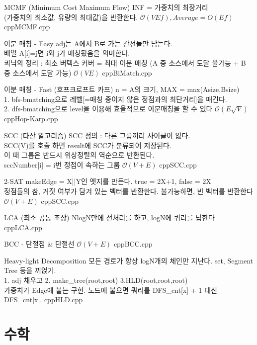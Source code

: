 \documentclass[landscape, 10pt, a4paper, oneside, twocolumn]{extarticle}
\begin{document}
\Algorithm
{MCMF (Minimum Cost Maximum Flow)}
{INF = 가중치의 최장거리\\
(가중치의 최소값, 유량의 최대값)을 반환한다.}
{$\mathcal{O}(VEf),{}Average = {O}(Ef)$}
{cpp}{MCMF.cpp}

\Algorithm
{이분 매칭 - Easy}
{adj는 A에서 B로 가는 간선들만 담는다.\\
배열 A[i]=j면 i와 j가 매칭됬음을 의미한다.\\
쾨닉의 정리 : 최소 버텍스 커버 = 최대 이분 매칭 (A 중 소스에서 도달 불가능 + B 중 소스에서 도달 가능)}
{$\mathcal{O}(VE)$}
{cpp}{BiMatch.cpp}

\Algorithm
{이분 매칭 - Fast (호프크로프트 카프)}
{n = A의 크기, MAX = max(Asize,Bsize)\\
1. bfs-bmatching으로 레벨[=매칭 중이지 않은 정점과의 최단거리]을 매긴다.\\
2. dfs-bmatching으로 level을 이용해 효율적으로 이분매칭을 할 수 있다
}
{$\mathcal{O}(E \sqrt{V})$}
{cpp}{Hop-Karp.cpp}

\Algorithm
{SCC (타잔 알고리즘)}
{SCC 정의 : 다른 그룹끼리 사이클이 없다.\\
SCC(V)를 호출 하면 result에 SCC가 분류되어 저장된다.\\
이 때 그룹은 반드시 위상정렬의 역순으로 반환된다.\\
sccNumber[i] = i번 정점이 속하는 그룹
}
{$\mathcal{O}(V+E)$}
{cpp}{SCC.cpp}

\Algorithm
{2-SAT}
{makeEdge = X||Y인 엣지를 만든다. true = 2X+1, false = 2X\\
정점들의 참, 거짓 여부가 담겨 있는 벡터를 반환한다. 불가능하면, 빈 벡터를 반환한다\\
}
{$\mathcal{O}(V+E)$}
{cpp}{SCC.cpp}

\Algorithm
{LCA (최소 공통 조상)}
{NlogN만에 전처리를 하고, logN에 쿼리를 답한다}
{}
{cpp}{LCA.cpp}

\Algorithm
{BCC - 단절점 & 단절선}
{}
{$\mathcal{O}(V+E)$}
{cpp}{BCC.cpp}

\Algorithm
{Heavy-light Decomposition}
{모든 경로가 항상 logN개의 체인만 지난다. set, Segment Tree 등을 끼얹기.\\
1. adj 채우고 2. make\_tree(root,root) 3.HLD(root,root,root)\\
가중치가 Edge에 붙는 구현. 노드에 붙으면 쿼리를 DFS\_cnt[x] + 1 대신 DFS\_cnt[x].
}
{}
{cpp}{HLD.cpp}


\section{수학}
\end{document}
